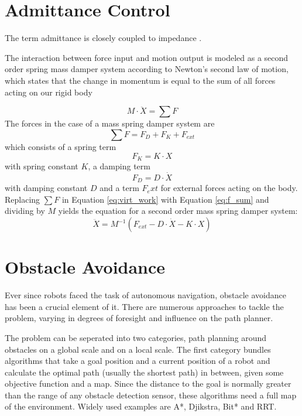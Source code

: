 \chapter{Admittance Control}
	\label{sec:adm_ctrl}
The term admittance is closely coupled to impedance \citep{hogan1985impedance}.

The interaction between force input and motion output is modeled as a second order spring mass damper system according to Newton's second law of motion, which states that the change in momentum is equal to the sum of all forces acting on our rigid body

\begin{equation}
M \cdot \ddot{X} = \sum F
	\label{eq:virt_work}
\end{equation}
The forces in the case of a mass spring damper system are
\begin{equation}
\sum F = F_D + F_K + F_{ext}
	\label{eq:f_sum}
\end{equation}
which consists of a spring term
\begin{equation}
F_K = K \cdot X
\end{equation}
with spring constant $K$, a damping term
\begin{equation}
F_D = D \cdot \dot{X}
\end{equation}
with damping constant $D$ and a term $F_ext$ for external forces acting on the body. Replacing $\sum F$ in Equation \ref{eq:virt_work} with Equation \ref{eq:f_sum} and dividing by $M$ yields the equation for a second order mass spring damper system:
\begin{equation}
\ddot{X} = M^{-1}(F_{ext} -D \cdot \dot{X} -K \cdot X)
	\label{eq:mass_spring_damper_sys}
\end{equation}




\chapter{Obstacle Avoidance}
Ever since robots faced the task of autonomous navigation, obstacle avoidance has been a crucial element of it. There are numerous approaches to tackle the problem, varying in degrees of foresight and influence on the path planner.

The problem can be seperated into two categories, path planning around obstacles on a global scale and on a local scale. The first category bundles algorithms that take a goal position and a current position of a robot and calculate the optimal path (usually the shortest path) in between, given some objective function and a map. Since the distance to the goal is normally greater than the range of any obstacle detection sensor, these algorithms need a full map of the environment. Widely used examples are A*, Djikstra, Bit* and RRT.

